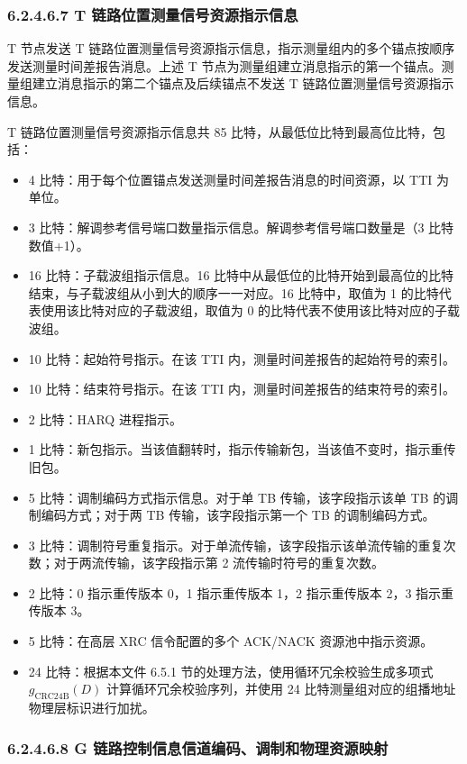 \documentclass[11pt,a4paper]{ctexart}
\begin{document}
\subsubsection{6.2.4.6.7 T 链路位置测量信号资源指示信息}

T 节点发送 T 链路位置测量信号资源指示信息，指示测量组内的多个锚点按顺序发送测量时间差报告消息。上述 T 节点为测量组建立消息指示的第一个锚点。测量组建立消息指示的第二个锚点及后续锚点不发送 T 链路位置测量信号资源指示信息。

T 链路位置测量信号资源指示信息共 85 比特，从最低位比特到最高位比特，包括：
\begin{itemize}[nosep]
  \item 4 比特：用于每个位置锚点发送测量时间差报告消息的时间资源，以 TTI 为单位。
  \item 3 比特：解调参考信号端口数量指示信息。解调参考信号端口数量是（3 比特数值+1）。
  \item 16 比特：子载波组指示信息。16 比特中从最低位的比特开始到最高位的比特结束，与子载波组从小到大的顺序一一对应。16 比特中，取值为 1 的比特代表使用该比特对应的子载波组，取值为 0 的比特代表不使用该比特对应的子载波组。
  \item 10 比特：起始符号指示。在该 TTI 内，测量时间差报告的起始符号的索引。
  \item 10 比特：结束符号指示。在该 TTI 内，测量时间差报告的结束符号的索引。
  \item 2 比特：HARQ 进程指示。
  \item 1 比特：新包指示。当该值翻转时，指示传输新包，当该值不变时，指示重传旧包。
  \item 5 比特：调制编码方式指示信息。对于单 TB 传输，该字段指示该单 TB 的调制编码方式；对于两 TB 传输，该字段指示第一个 TB 的调制编码方式。
  \item 3 比特：调制符号重复指示。对于单流传输，该字段指示该单流传输的重复次数；对于两流传输，该字段指示第 2 流传输时符号的重复次数。
  \item 2 比特：0 指示重传版本 0，1 指示重传版本 1，2 指示重传版本 2，3 指示重传版本 3。
  \item 5 比特：在高层 XRC 信令配置的多个 ACK/NACK 资源池中指示资源。
  \item 24 比特：根据本文件 6.5.1 节的处理方法，使用循环冗余校验生成多项式 $g_{\mathrm{CRC24B}}(D)$ 计算循环冗余校验序列，并使用 24 比特测量组对应的组播地址物理层标识进行加扰。
\end{itemize}

\subsubsection{6.2.4.6.8 G 链路控制信息信道编码、调制和物理资源映射}
\end{document}
